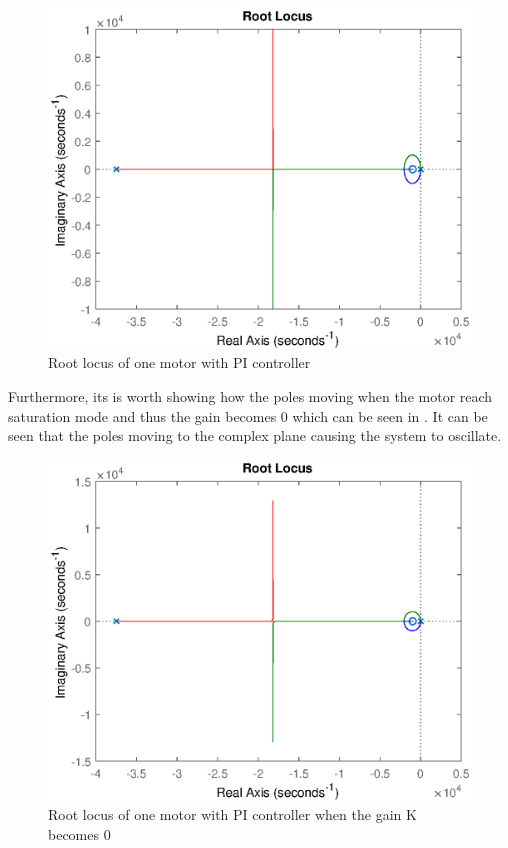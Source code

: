 \begin{figure}[H]
	\includegraphics[width=0.9\linewidth]{figures/rloci_new}
	\caption{Root locus of one motor with PI controller}
	\label{fig:rlocus33}
\end{figure}
Furthermore, its is worth showing how the poles moving when the motor reach saturation mode and thus the gain becomes 0 which can be seen in . It can be seen that the poles moving to the complex plane causing the system to oscillate. 
\begin{figure}[H]
	\includegraphics[width=0.9\linewidth]{figures/stauration_motor_mode}
	\caption{Root locus of one motor with PI controller when the gain K becomes 0}
	\label{fig:rlocus44}
\end{figure}
